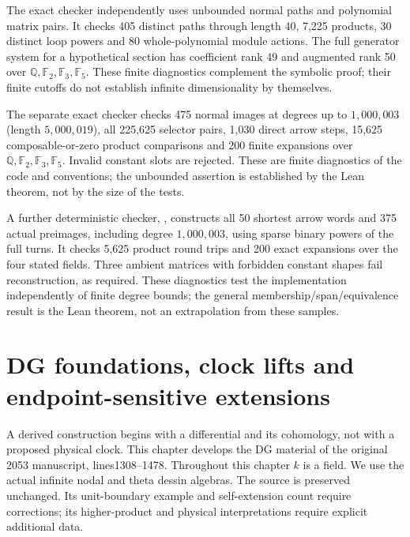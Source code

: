 \documentclass[11pt,oneside,openany]{book}
\theoremstyle{definition}\newtheorem{definition}[theorem]{Definition}
\theoremstyle{remark}\newtheorem{remark}[theorem]{Remark}
\begin{document}
The exact checker  independently
uses unbounded normal paths and polynomial matrix pairs. It checks
405 distinct paths through length 40, 7,225 products, 30 distinct loop
powers and 80 whole-polynomial module actions. The full generator system
for a hypothetical section has coefficient rank 49 and augmented rank 50
over $\mathbb Q,\mathbb F_2,\mathbb F_3,\mathbb F_5$.
These finite diagnostics complement the symbolic proof; their finite
cutoffs do not establish infinite dimensionality by themselves.


The separate exact checker 
checks 475 normal images at degrees up to $1{,}000{,}003$ (length
$5{,}000{,}019$), all 225,625 selector pairs, 1,030 direct arrow steps,
15,625 composable-or-zero product comparisons and 200 finite expansions
over $\mathbb Q,\mathbb F_2,\mathbb F_3,\mathbb F_5$. Invalid constant
slots are rejected. These are finite diagnostics of the code and
conventions; the unbounded assertion is established by the Lean theorem,
not by the size of the tests.


A further deterministic checker,
, constructs all 50 shortest
arrow words and 375 actual preimages, including degree $1{,}000{,}003$,
using sparse binary powers of the full turns. It checks 5,625 product
round trips and 200 exact expansions over the four stated fields.
Three ambient matrices with forbidden constant shapes fail reconstruction,
as required. These diagnostics test the implementation independently of
finite degree bounds; the general membership/span/equivalence result is
the Lean theorem, not an extrapolation from these samples.


\chapter[DG foundations and actual clock lifts]{DG foundations, clock lifts and endpoint-sensitive extensions}
\label{dg:chapter}
A derived construction begins with a differential and its cohomology, not
with a proposed physical clock. This chapter develops the DG material of the
original 2053 manuscript, lines1308--1478. Throughout this chapter $k$ is a
field. We use the actual infinite nodal
and theta dessin algebras. The source is preserved unchanged. Its unit-boundary
example and self-extension count require corrections; its higher-product
and physical interpretations require explicit additional data.
\end{document}
